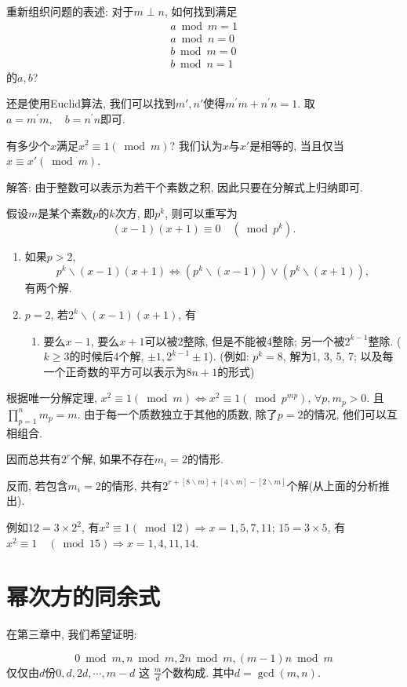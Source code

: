 \documentclass{ctexart}
\begin{document}
重新组织问题的表述: 对于$m \perp n$, 如何找到满足
\begin{align*}
    a\bmod m = 1\\
    a \bmod n = 0\\
    b \bmod m = 0\\
    b \bmod n = 1
\end{align*}
的$a,b $?

还是使用Euclid算法, 我们可以找到$m', n'$使得$m^{\prime} m+n^{\prime} n=1$. 取$a=m^{\prime} m, \quad b=n^{\prime} n$即可. 

\begin{example} 有多少个$x$满足$x^2\equiv 1(\bmod m)$? 我们认为$x$与$x'$是相等的, 当且仅当$x\equiv x' (\bmod m)$.
    

解答: 由于整数可以表示为若干个素数之积, 因此只要在分解式上归纳即可. 

假设$m$是某个素数$p$的$k$次方, 即$p^k$, 则可以重写为$$
(x-1)(x+1) \equiv 0 \quad\left(\bmod p^k\right) .
$$
\begin{enumerate}
    \item 如果$p>2$, $$p^k \backslash(x-1)(x+1) \Leftrightarrow\left(p^k \backslash(x-1)\right) \vee\left(p^k \backslash(x+1)\right), $$有两个解.
    \item $p=2$, 若$2^k \backslash(x-1)(x+1)$, 有
        \begin{enumerate}
            \item 要么$x-1$, 要么$x+1$可以被2整除, 但是不能被4整除; 另一个被$2^{k-1}$整除. ($k\geq 3$的时候后4个解, $\pm 1, 2^{k-1}\pm 1$).
                (例如: $p^k=8$, 解为1, 3, 5, 7; 以及每一个正奇数的平方可以表示为$8n+1$的形式)
        \end{enumerate}
\end{enumerate}

根据唯一分解定理, $x^2 \equiv 1(\bmod m) \Leftrightarrow x^2 \equiv 1\left(\bmod p^{m p}\right)$, $\forall p, m_p>0$. 且 $\prod_{p=1}^n m_p=m$. 由于每一个质数独立于其他的质数, 除了$p=2$的情况, 他们可以互相组合. 

因而总共有$2^r$个解, 如果不存在$m_i=2$的情形. 

反而, 若包含$m_i=2$的情形, 共有$2^{r+[8 \backslash m]+[4 \backslash m]-[2 \backslash m]}$个解(从上面的分析推出). 

例如$12=3 \times 2^2$, 有$x^2 \equiv 1(\bmod 12) \Rightarrow x=1,5,7,11$; $15=3 \times 5$, 有$x^2 \equiv 1 \quad(\bmod 15) \Rightarrow x=1,4,11,14$.
\end{example}

\section{幂次方的同余式} 在第三章中, 我们希望证明:
\begin{prop}
$$
0 \bmod m, n \bmod m, 2 n \bmod m,(m-1) n \bmod m
$$
仅仅由$d$份$0, d, 2 d, \cdots, m-d$ 这 $\frac{m}{d} $个数构成. 其中$d=\operatorname{gcd}(m, n)$. 
    
\end{prop}
\end{document}
